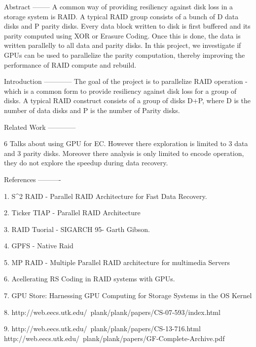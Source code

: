 Abstract
--------
A common way of providing resiliency against disk loss in a storage system is RAID. A typical RAID group consists of a bunch of D data disks and P parity disks. Every data block written to disk is first buffered and its parity computed using XOR or Erasure Coding. Once this is done, the data is written parallelly to all data and parity disks. In this project, we investigate if GPUs can be used to parallelize the parity computation, thereby improving the performance of RAID compute and rebuild.

Introduction
------------
The goal of the project is to parallelize RAID operation - which is a common form to provide resiliency against disk loss for a group of disks. A typical RAID construct consists of a group of disks D+P, where D is the number of data disks and P is the number of Parity disks.


Related Work
------------

6 Talks about using GPU for EC. However there exploration is limited to 3 data and 3 parity disks. Moreover there analysis is only limited to encode operation, they do not explore the speedup during data recovery.


References
----------

1. S^2 RAID - Parallel RAID Architecture for Fast Data Recovery.

2. Ticker TIAP - Parallel RAID Architecture

3. RAID Tuorial - SIGARCH 95- Garth Gibson.

4. GPFS - Native Raid

5. MP RAID - Multiple Parallel RAID architecture for multimedia Servers

6. Acellerating RS Coding in RAID systems with GPUs.

7. GPU Store: Harnessing GPU Computing for Storage Systems in the OS Kernel

8. http://web.eecs.utk.edu/~plank/plank/papers/CS-07-593/index.html

9. http://web.eecs.utk.edu/~plank/plank/papers/CS-13-716.html
http://web.eecs.utk.edu/~plank/plank/papers/GF-Complete-Archive.pdf

